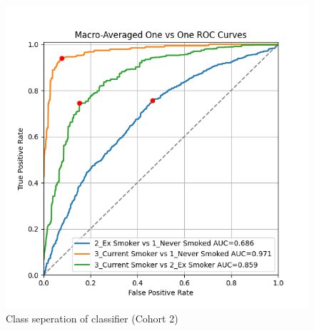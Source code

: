 \documentclass{article}
\begin{document}
\begin{figure}
    \centering
    \includegraphics[width=\linewidth]{cohort2_macro_ovo_roc.png}
    \caption{Class seperation of classifier (Cohort 2)}
\end{figure}
\end{document}
